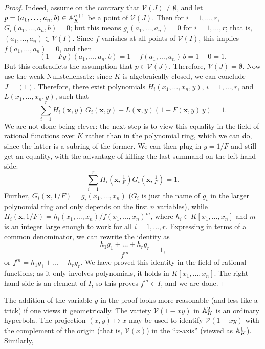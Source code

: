 \begin{proof}
  Indeed, assume on the contrary that $\mathcal{V}(J) \neq \emptyset$,
  and let $p = (a_1, \dots, a_n, b) \in \mathbb{A}^{n+1}_K$ be a point of
  $\mathcal{V}(J)$. Then for $i = 1, \dots, r$,
  $G_i(a_1, \dots, a_n, b) = 0$; but this means
  $g_i(a_1, \dots, a_n) = 0$ for $i = 1, \dots, r$; that is,
  $(a_1, \dots, a_n) \in \mathcal{V}(I)$. Since $f$ vanishes at all
  points of $\mathcal{V}(I)$, this implies $f(a_1, \dots, a_n) = 0$,
  and then
  \[
    (1 - Fy)(a_1, \dots, a_n, b) = 1 - f(a_1, \dots, a_n)\,b = 1 - 0 =
    1.
  \]
  But this contradicts the assumption that $p \in \mathcal{V}(J)$.
  Therefore, $\mathcal{V}(J) = \emptyset$.  Now use the weak
  Nullstellensatz: since $K$ is algebraically closed, we can conclude
  $J = (1)$. Therefore, there exist polynomials
  $H_i(x_1, \dots, x_n, y)$, $i = 1, \dots, r$, and
  $L(x_1, \dots, x_n, y)$, such that
  \[
    \sum_{i=1}^{r} H_i(\mathbf{x}, y)\,G_i(\mathbf{x}, y) +
    L(\mathbf{x}, y)(1 - F(\mathbf{x}, y)\,y) = 1.
  \]
  We are not done being clever: the next step is to view this equality
  in the field of rational functions over $K$ rather than in the
  polynomial ring, which we can do, since the latter is a subring of
  the former. We can then plug in $y = 1/F$ and still get an equality,
  with the advantage of killing the last summand on the left-hand
  side:
  \[
    \sum_{i=1}^{r} H_i\!\left(\mathbf{x}, \tfrac{1}{F}\right)
    G_i\!\left(\mathbf{x}, \tfrac{1}{F}\right) = 1.
  \]
  Further, $G_i(\mathbf{x}, 1/F) = g_i(x_1, \dots, x_n)$ ($G_i$ is
  just the name of $g_i$ in the larger polynomial ring and only
  depends on the first $n$ variables), while
  $H_i(\mathbf{x}, 1/F) = {h_i(x_1, \dots, x_n)/f(x_1, \dots,
    x_n)}^m$, where $h_i \in K[x_1, \dots, x_n]$ and $m$ is an integer
  large enough to work for all $i = 1, \dots, r$. Expressing in terms
  of a common denominator, we can rewrite the identity as
  \[
    \frac{h_1 g_1 + \dots + h_r g_r}{f^m} = 1,
  \]
  or $f^m = h_1 g_1 + \dots + h_r g_r$. We have proved this identity
  in the field of rational functions; as it only involves polynomials,
  it holds in $K[x_1, \dots, x_n]$. The right-hand side is an element
  of $I$, so this proves $f^m \in I$, and we are done.
\end{proof}
The addition of the variable $y$ in the proof looks more reasonable
(and less like a trick) if one views it geometrically. The variety
$\mathcal{V}(1 - xy)$ in $\mathbb{A}^2_K$ is an ordinary hyperbola. The
projection $(x, y) \mapsto x$ may be used to identify
$\mathcal{V}(1 - xy)$ with the complement of the origin (that is,
$\mathcal{V}(x)$) in the ``$x$-axis'' (viewed as $\mathbb{A}^1_K$). Similarly,
